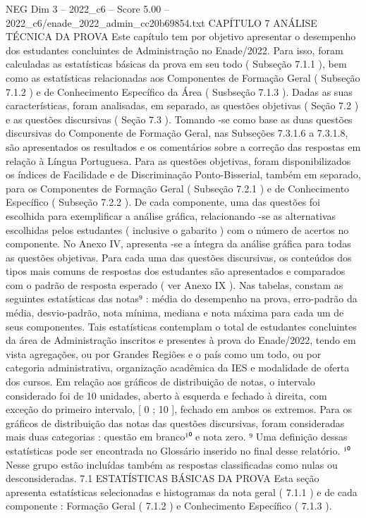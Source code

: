\begin{textsample}{NEG Dim 3 – 2022\_c6 – Score 5.00 – 2022\_c6/enade\_2022\_admin\_cc20b69854.txt}  \label{ex:f3_neg_257}
CAPÍTULO 7 ANÁLISE TÉCNICA DA PROVA Este capítulo tem por objetivo apresentar o desempenho dos estudantes concluintes de Administração no Enade/2022.
Para isso, foram calculadas as estatísticas básicas da prova em seu todo ( Subseção 7.1.1 ), bem como as estatísticas relacionadas aos Componentes de Formação Geral ( Subseção 7.1.2 ) e de Conhecimento Específico da Área ( Susbseção 7.1.3 ).
Dadas as suas características, foram analisadas, em separado, as questões objetivas ( Seção 7.2 ) e as questões discursivas ( Seção 7.3 ).
Tomando -se como base as duas questões discursivas do Componente de Formação Geral, nas Subseções 7.3.1.6 a 7.3.1.8, são apresentados os resultados e os comentários sobre a correção das respostas em relação à Língua Portuguesa.
Para as questões objetivas, foram disponibilizados os índices de Facilidade e de Discriminação Ponto-Bisserial, também em separado, para os Componentes de Formação Geral ( Subseção 7.2.1 ) e de Conhecimento Específico ( Subseção 7.2.2 ).
De cada componente, uma das questões foi escolhida para exemplificar a análise gráfica, relacionando -se as alternativas escolhidas pelos estudantes ( inclusive o gabarito ) com o número de acertos no componente.
No Anexo IV, apresenta -se a íntegra da análise gráfica para todas as questões objetivas.
Para cada uma das questões discursivas, os conteúdos dos tipos mais comuns de respostas dos estudantes são apresentados e comparados com o padrão de resposta esperado ( ver Anexo IX ).
Nas tabelas, constam as seguintes estatísticas das notas⁹ : média do desempenho na prova, erro-padrão da média, desvio-padrão, nota mínima, mediana e nota máxima para cada um de seus componentes.
Tais estatísticas contemplam o total de estudantes concluintes da área de Administração inscritos e presentes à prova do Enade/2022, tendo em vista agregações, ou por Grandes Regiões e o país como um todo, ou por categoria administrativa, organização acadêmica da IES e modalidade de oferta dos cursos.
Em relação aos gráficos de distribuição de notas, o intervalo considerado foi de 10 unidades, aberto à esquerda e fechado à direita, com exceção do primeiro intervalo, [ 0 ; 10 ], fechado em ambos os extremos.
Para os gráficos de distribuição das notas das questões discursivas, foram consideradas mais duas categorias : questão em branco¹⁰ e nota zero. ⁹ Uma definição dessas estatísticas pode ser encontrada no Glossário inserido no final desse relatório. ¹⁰ Nesse grupo estão incluídas também as respostas classificadas como nulas ou desconsideradas. 7.1 ESTATÍSTICAS BÁSICAS DA PROVA Esta seção apresenta estatísticas selecionadas e histogramas da nota geral ( 7.1.1 ) e de cada componente : Formação Geral ( 7.1.2 ) e Conhecimento Específico ( 7.1.3 ).

\end{textsample}

